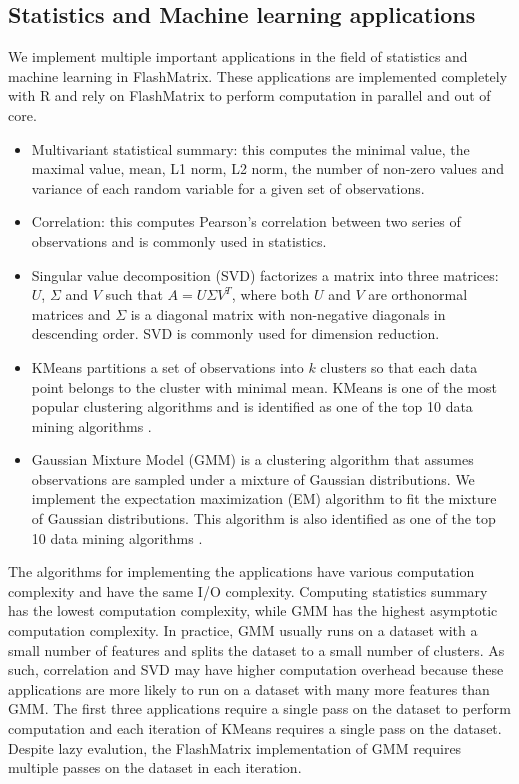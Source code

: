 \subsection{Statistics and Machine learning applications} \label{sec:apps}
We implement multiple important applications in the field of statistics and
machine learning in FlashMatrix. These applications are implemented completely
with R and rely on FlashMatrix to perform computation in parallel and out of
core.
\begin{itemize}
	\item Multivariant statistical summary: this computes the minimal value,
		the maximal value, mean, L1 norm, L2 norm, the number of non-zero values
		and variance of each random variable for a given set of observations.
	\item Correlation: this computes Pearson's correlation \cite{} between
		two series of observations and is commonly used in statistics.
	\item Singular value decomposition (SVD) \cite{} factorizes a matrix into
		three matrices: $U$, $\Sigma$ and $V$ such that $A=U \Sigma V^T$, where
		both $U$ and $V$ are orthonormal matrices and $\Sigma$ is a diagonal
		matrix with non-negative diagonals in descending order. SVD is commonly
		used for dimension reduction.
	\item KMeans \cite{kmeans} partitions a set of observations into $k$ clusters
		so that each data point belongs to the cluster with minimal mean. KMeans
		is one of the most popular clustering algorithms and is identified as
		one of the top 10 data mining algorithms \cite{top10}.
	\item Gaussian Mixture Model (GMM) \cite{gmm} is a clustering algorithm that
		assumes observations are sampled under a mixture of Gaussian distributions.
		We implement the expectation maximization (EM) \cite{em} algorithm to fit
		the mixture of Gaussian distributions. This algorithm is also identified
		as one of the top 10 data mining algorithms \cite{top10}.
\end{itemize}

The algorithms for implementing the applications have various computation
complexity and have the same I/O complexity. Computing statistics summary
has the lowest computation complexity, while GMM has the highest asymptotic
computation complexity. In practice, GMM usually runs on a dataset with
a small number of features and splits the dataset to a small number of clusters.
As such, correlation and SVD may have higher computation overhead because
these applications are more likely to run on a dataset with many more features
than GMM. The first three applications require a single pass on the dataset
to perform computation and each iteration of KMeans requires a single pass
on the dataset. Despite lazy evalution, the FlashMatrix implementation of
GMM requires multiple passes on the dataset in each iteration.

